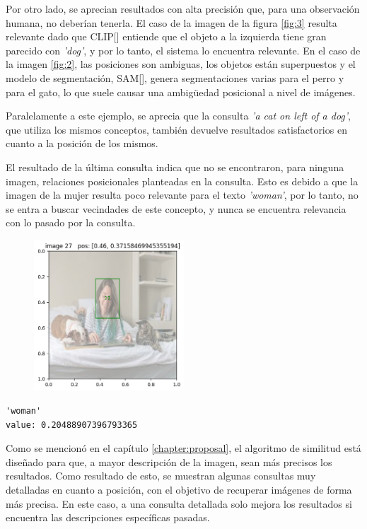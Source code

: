 Por otro lado, se aprecian resultados con alta precisión que, para una observación humana, no deberían tenerla. El caso de la imagen de la figura \ref{fig:3} resulta relevante dado que CLIP[\cite{clip}] entiende que el objeto a la izquierda tiene gran parecido con \textit{'dog'}, y por lo tanto, el sistema lo encuentra relevante. En el caso de la imagen \ref{fig:2}, las posiciones son ambiguas, los objetos est\'an superpuestos y el modelo de segmentación, SAM[\cite{sam-paper}], genera segmentaciones varias para el perro y para el gato, lo que suele causar una ambigüedad posicional a nivel de im\'agenes.

Paralelamente a este ejemplo, se aprecia que la consulta \textit{'a cat on left of a dog'}, que utiliza los mismos conceptos, también devuelve resultados satisfactorios en cuanto a la posición de los mismos.

El resultado de la última consulta indica que no se encontraron, para ninguna imagen, relaciones posicionales planteadas en la consulta. Esto es debido a que la imagen de la mujer resulta poco relevante para el texto \textit{'woman'}, por lo tanto, no se entra a buscar vecindades de este concepto, y nunca se encuentra relevancia con lo pasado por la consulta.


\begin{figure}[H]
\centering
 \includegraphics[width=0.5\textwidth]{Graphics/woman.png}
 \caption{ }
 \label{fig:woman}
\end{figure}

\begin{verbatim}
'woman'
value: 0.20488907396793365
\end{verbatim}

Como se mencionó en el capítulo \ref{chapter:proposal}, el algoritmo de similitud est\'a diseñado para que, a mayor descripción de la imagen, sean m\'as precisos los resultados. Como resultado de esto, se muestran algunas consultas muy detalladas en cuanto a posición, con el objetivo de recuperar im\'agenes de forma m\'as precisa. En este caso, a una consulta detallada solo mejora los resultados si encuentra las descripciones específicas pasadas.

